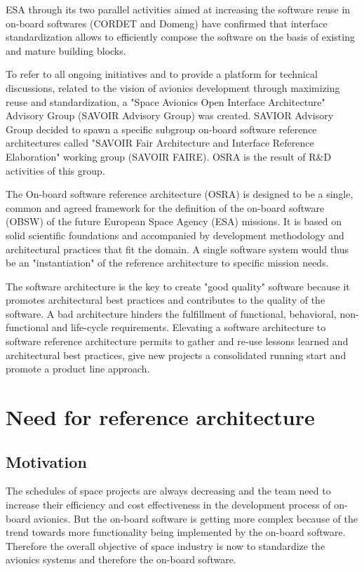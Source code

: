 ESA through its two parallel activities aimed at increasing the software reuse in on-board softwares (CORDET and Domeng) have confirmed that interface standardization allows to efficiently compose the software on the basis of existing and mature building blocks.

To refer to all ongoing initiatives and to provide a platform for technical discussions, related to the vision of avionics development through maximizing reuse and standardization, a "Space Avionics Open Interface Architecture" Advisory Group (SAVOIR Advisory Group) was created. SAVIOR Advisory Group decided to spawn a specific subgroup on-board software reference architectures called "SAVOIR Fair Architecture and Interface Reference Elaboration" working group (SAVOIR FAIRE). OSRA is the result of R\&D activities of this group.   

The On-board software reference architecture (OSRA) is designed to be a single, common and agreed framework for the definition of the on-board software (OBSW) of the future European Space Agency (ESA) missions. It is based on solid scientific foundations and accompanied by development methodology and architectural practices that fit the domain. A single software system would thus be an "instantiation" of the reference architecture to specific mission needs.

The software architecture is the key to create "good quality" software because it promotes architectural best practices and contributes to the quality of the software. A bad architecture hinders the fulfillment of functional, behavioral, non-functional and life-cycle requirements. Elevating a software architecture to software reference architecture permits to gather and re-use lessons learned and architectural best practices, give new projects a consolidated running start and promote a product line approach.

\section*{Need for reference architecture}
\subsection*{Motivation} 
The schedules of space projects are always decreasing and the team need to increase their efficiency and cost effectiveness in the development process of on-board avionics. But the on-board software is getting more complex because of the trend towards more functionality being implemented by the on-board software. Therefore the overall objective of space industry is now to standardize the avionics systems and therefore the on-board software.

